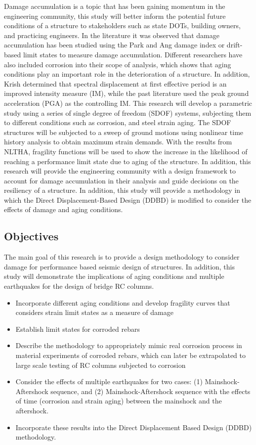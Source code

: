 Damage accumulation is a topic that has been gaining momentum in the engineering community, this study will better inform  the potential future conditions of a structure to stakeholders such as state DOTs, building owners, and practicing engineers. In the literature it was observed that damage accumulation has been studied using the Park and Ang damage index or drift-based limit states to measure damage accumulation. Different researchers have also included corrosion into their scope of analysis, which shows that aging conditions play an important role in the deterioration of a structure. In addition, Krish \cite{Krish2018} determined that spectral displacement at first effective period is an improved intensity measure (IM), while the past literature used the peak ground acceleration (PGA) as the controlling IM. This research will develop a parametric study using a series of single degree of freedom (SDOF) systems, subjecting them to different conditions such as corrosion, and steel strain aging. The SDOF structures will be subjected to a sweep of ground motions using nonlinear time history analysis to obtain maximum strain demands. With the results from NLTHA, fragility functions will be used to show the increase in the likelihood of reaching a performance limit state due to aging of the structure. In addition, this research will provide the engineering community with a design framework to account for damage accumulation in their analysis and guide decisions on the resiliency of a structure. In addition, this study will provide a methodology in which the Direct Displacement-Based Design (DDBD) is modified to consider the effects of damage and aging conditions.

\subsection{Objectives}
The main goal of this research is to provide a design methodology to consider damage for performance based seismic design of structures. In addition, this study will demonstrate the implications of aging conditions and multiple earthquakes for the design of bridge RC columns.


\begin{itemize}
	\item Incorporate different aging conditions and develop fragility curves that considers strain limit states as a measure of damage
	\item Establish limit states for corroded rebars
	\item Describe the methodology to appropriately mimic real corrosion process in material experiments of corroded rebars, which can later be extrapolated to large scale testing of RC columns subjected to corrosion
	\item Consider the effects of multiple earthquakes for  two cases: (1) Mainshock-Aftershock sequence, and (2) Mainshock-Aftershock sequence with the effects of time (corrosion and strain aging) between the mainshock and the aftershock.
	\item Incorporate these results into the Direct Displacement Based Design (DDBD) methodology.
\end{itemize}